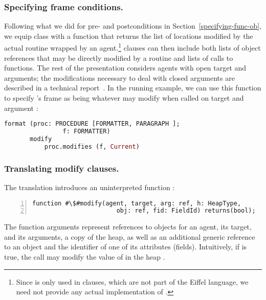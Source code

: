 \subsubsection{Specifying frame conditions.}
Following what we did for pre- and postconditions in Section~\ref{specifying-func-ob}, we equip class  with a function  that returns the list of locations modified by the actual routine wrapped by an agent.\footnote{Since  is only used in  clauses, which are not part of the Eiffel language, we need not provide any actual implementation of .}
 clauses can then include both lists of object references that may be directly modified by a routine and lists of calls to  functions.
The rest of the presentation considers agents with open target and arguments; the modifications necessary to deal with closed arguments are described in a technical report~\cite{NordioCalcagnoMeyerMueller08c}.
In the running example, we can use this function to specify 's frame as being whatever  may modify when called on target  and argument :
\begin{lstlisting}[language=Eiffel, escapechar=\#]
     format (proc: PROCEDURE [FORMATTER, PARAGRAPH ]; 
                f: FORMATTER)
       modify
           proc.modifies (f, Current)
\end{lstlisting}









\subsubsection{Translating modify clauses.}
The translation introduces an uninterpreted function :
\begin{lstlisting}[escapechar=\#,numbers=left,language=Boogie]
     function #\$#modify(agent, target, arg: ref, h: HeapType, 
                       obj: ref, fid: FieldId) returns(bool);
\end{lstlisting} 
The function arguments represent references to objects for an agent, its target, and its arguments, a copy of the heap, as well as an additional generic reference  to an object and the identifier  of one of its attributes (fields).
Intuitively, if  is true, the call  may modify the value of  in the heap .


